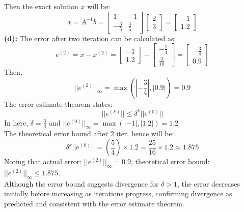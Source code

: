 \documentclass{article}
\begin{document}
Then the exact solution $x$ will be:
\[ x = A^{-1}b = \begin{bmatrix} 1 & -1 \\ -\frac{3}{5} & \frac{4}{5} \end{bmatrix} \begin{bmatrix} 2 \\ 3 \end{bmatrix} = \begin{bmatrix} -1 \\ 1.2 \end{bmatrix} \]
\textbf{(d): }
The error after two iteration can be calculated as:
\[ e^{(2)} = x - x^{(2)} = \begin{bmatrix} -1 \\ 1.2 \end{bmatrix} - \begin{bmatrix} -\frac{1}{4} \\ \frac{3}{10} \end{bmatrix} = \begin{bmatrix} -\frac{3}{4} \\ 0.9 \end{bmatrix} \]
Then,
\[ ||e^{(2)}||_{\infty} = \max \left(|-\frac{3}{4}|, |0.9| \right) = 0.9 \]
The error estimate theorem states:
\[ ||e^{(k)}|| \leq \delta^k ||e^{(0)}|| \]
In here, $\delta = \frac{5}{4}$ and $||e^{(0)}||_{\infty} = \max(|-1|, |1.2|) = 1.2$
\\
The theoretical error bound after 2 iter. hence will be:
\[ \delta^k ||e^{(0)}|| = \left( \frac{5}{4} \right) \times 1.2 = \frac{25}{16} \times 1.2 \approx 1.875 \]
Noting that actual error: $||e^{(2)}||_{\infty} = 0.9$, theoretical error bound: $||e^{(2)}||_{\infty} \leq 1.875$. 
\\
Although the error bound suggests divergence for \( \delta > 1 \), the error decreases initially before increasing as iterations progress, confirming divergence as predicted and consistent with the error estimate theorem.
\end{document}
